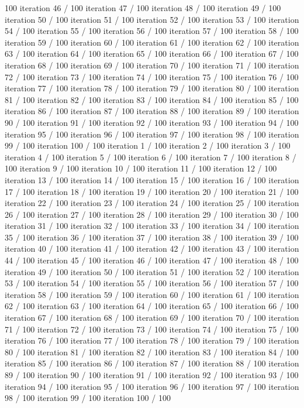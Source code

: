 100 iteration 46 / 100 iteration 47 / 100 iteration 48 / 100 iteration
49 / 100 iteration 50 / 100 iteration 51 / 100 iteration 52 / 100
iteration 53 / 100 iteration 54 / 100 iteration 55 / 100 iteration 56 /
100 iteration 57 / 100 iteration 58 / 100 iteration 59 / 100 iteration
60 / 100 iteration 61 / 100 iteration 62 / 100 iteration 63 / 100
iteration 64 / 100 iteration 65 / 100 iteration 66 / 100 iteration 67 /
100 iteration 68 / 100 iteration 69 / 100 iteration 70 / 100 iteration
71 / 100 iteration 72 / 100 iteration 73 / 100 iteration 74 / 100
iteration 75 / 100 iteration 76 / 100 iteration 77 / 100 iteration 78 /
100 iteration 79 / 100 iteration 80 / 100 iteration 81 / 100 iteration
82 / 100 iteration 83 / 100 iteration 84 / 100 iteration 85 / 100
iteration 86 / 100 iteration 87 / 100 iteration 88 / 100 iteration 89 /
100 iteration 90 / 100 iteration 91 / 100 iteration 92 / 100 iteration
93 / 100 iteration 94 / 100 iteration 95 / 100 iteration 96 / 100
iteration 97 / 100 iteration 98 / 100 iteration 99 / 100 iteration 100 /
100 iteration 1 / 100 iteration 2 / 100 iteration 3 / 100 iteration 4 /
100 iteration 5 / 100 iteration 6 / 100 iteration 7 / 100 iteration 8 /
100 iteration 9 / 100 iteration 10 / 100 iteration 11 / 100 iteration 12
/ 100 iteration 13 / 100 iteration 14 / 100 iteration 15 / 100 iteration
16 / 100 iteration 17 / 100 iteration 18 / 100 iteration 19 / 100
iteration 20 / 100 iteration 21 / 100 iteration 22 / 100 iteration 23 /
100 iteration 24 / 100 iteration 25 / 100 iteration 26 / 100 iteration
27 / 100 iteration 28 / 100 iteration 29 / 100 iteration 30 / 100
iteration 31 / 100 iteration 32 / 100 iteration 33 / 100 iteration 34 /
100 iteration 35 / 100 iteration 36 / 100 iteration 37 / 100 iteration
38 / 100 iteration 39 / 100 iteration 40 / 100 iteration 41 / 100
iteration 42 / 100 iteration 43 / 100 iteration 44 / 100 iteration 45 /
100 iteration 46 / 100 iteration 47 / 100 iteration 48 / 100 iteration
49 / 100 iteration 50 / 100 iteration 51 / 100 iteration 52 / 100
iteration 53 / 100 iteration 54 / 100 iteration 55 / 100 iteration 56 /
100 iteration 57 / 100 iteration 58 / 100 iteration 59 / 100 iteration
60 / 100 iteration 61 / 100 iteration 62 / 100 iteration 63 / 100
iteration 64 / 100 iteration 65 / 100 iteration 66 / 100 iteration 67 /
100 iteration 68 / 100 iteration 69 / 100 iteration 70 / 100 iteration
71 / 100 iteration 72 / 100 iteration 73 / 100 iteration 74 / 100
iteration 75 / 100 iteration 76 / 100 iteration 77 / 100 iteration 78 /
100 iteration 79 / 100 iteration 80 / 100 iteration 81 / 100 iteration
82 / 100 iteration 83 / 100 iteration 84 / 100 iteration 85 / 100
iteration 86 / 100 iteration 87 / 100 iteration 88 / 100 iteration 89 /
100 iteration 90 / 100 iteration 91 / 100 iteration 92 / 100 iteration
93 / 100 iteration 94 / 100 iteration 95 / 100 iteration 96 / 100
iteration 97 / 100 iteration 98 / 100 iteration 99 / 100 iteration 100 /
100

